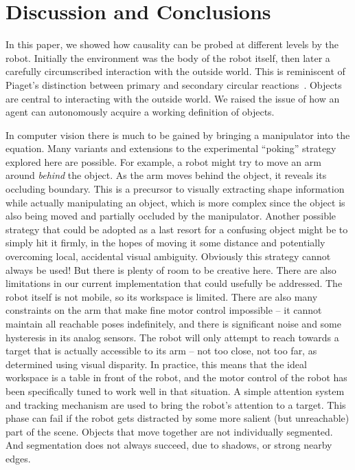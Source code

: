 
\section{Discussion and Conclusions}

In this paper, we showed how causality can be probed at different
levels by the robot.  Initially the environment was the body of the
robot itself, then later a carefully circumscribed interaction with
the outside world.  This is reminiscent of Piaget's distinction
between primary and secondary circular
reactions~\cite{ginsburg78piaget}.  Objects are central to interacting
with the outside world.  We raised the issue of how an agent can
autonomously acquire a working definition of objects. 

In computer vision there is much to be gained by bringing a
manipulator into the equation.  Many variants and extensions to the
experimental ``poking'' strategy explored here are possible.  For
example, a robot might try to move an arm around {\em behind} the
object.  As the arm moves behind the object, it reveals its occluding
boundary.  This is a precursor to visually extracting shape
information while actually manipulating an object, which is more
complex since the object is also being moved and partially occluded by
the manipulator.  Another possible strategy that could be adopted as a
last resort for a confusing object might be to simply hit it firmly,
in the hopes of moving it some distance and potentially overcoming
local, accidental visual ambiguity.  Obviously this strategy cannot
always be used!  But there is plenty of room to be creative here.
%
%
\ifrev
%
There are also limitations in our current implementation that could
usefully be addressed.
%
The robot itself is not mobile, so its workspace is limited.  
%
There are also many constraints on the arm that make fine 
motor control impossible -- it cannot maintain all reachable 
poses indefinitely, and there is significant noise and some 
hysteresis in its analog sensors.
%
The robot will only attempt to reach towards a target that is 
actually accessible to its arm -- not too close, not too far, 
as determined using visual disparity.  In practice, this 
means that the ideal workspace is a table in front of the 
robot, and the motor control of the robot has been 
specifically tuned to work well in that situation.
%
A simple attention system and tracking mechanism are used to 
bring the robot's attention to a target.  This phase can fail 
if the robot gets distracted by some more salient (but 
unreachable) part of the scene.
%
Objects that move together are not individually segmented.
%
And segmentation does not always succeed, due to shadows,
or strong nearby edges.
%
\fi

